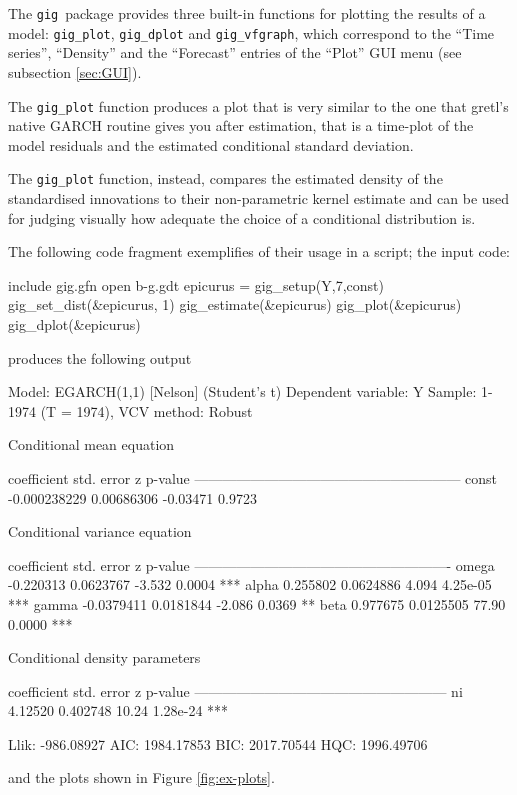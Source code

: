 \documentclass[a4paper,11pt]{article}
\newcommand{\app}[1]{\textsf{#1}}
\newcommand{\cmd}[1]{\texttt{#1}}
\newcounter{script}[section]
\newcommand{\gig}{\texttt{gig}}
\begin{document}
The \gig\ package provides three built-in functions for plotting the
results of a model: \cmd{gig\_plot}, \cmd{gig\_dplot} and
\cmd{gig\_vfgraph}, which correspond to the ``Time series'',
``Density'' and the ``Forecast'' entries of the ``Plot'' GUI menu (see
subsection \ref{sec:GUI}).

The \cmd{gig\_plot} function produces a plot that is very similar to
the one that \app{gretl}'s native GARCH routine gives you after
estimation, that is a time-plot of the model residuals and the
estimated conditional standard deviation. 

The \cmd{gig\_plot} function, instead, compares the estimated density
of the standardised innovations to their non-parametric kernel
estimate and can be used for judging visually how adequate the choice
of a conditional distribution is.

The following code
fragment exemplifies of their usage in a script; the input code:

\begin{code}
include gig.gfn
open b-g.gdt
epicurus = gig_setup(Y,7,const)
gig_set_dist(&epicurus, 1)
gig_estimate(&epicurus)
gig_plot(&epicurus)
gig_dplot(&epicurus)  
\end{code}
produces the following output
\begin{code}
Model: EGARCH(1,1) [Nelson] (Student's t)
Dependent variable: Y
Sample: 1-1974 (T = 1974), VCV method: Robust

    Conditional mean equation

             coefficient    std. error      z       p-value
  ---------------------------------------------------------
  const      -0.000238229   0.00686306   -0.03471   0.9723 

    Conditional variance equation

             coefficient   std. error     z      p-value 
  -------------------------------------------------------
  omega      -0.220313     0.0623767    -3.532   0.0004   ***
  alpha       0.255802     0.0624886     4.094   4.25e-05 ***
  gamma      -0.0379411    0.0181844    -2.086   0.0369   **
  beta        0.977675     0.0125505    77.90    0.0000   ***

    Conditional density parameters

             coefficient   std. error     z     p-value 
  ------------------------------------------------------
  ni           4.12520      0.402748    10.24   1.28e-24 ***

	Llik:   -986.08927	 AIC:   1984.17853
	BIC:    2017.70544	 HQC:   1996.49706
\end{code}
and the plots shown in Figure \ref{fig:ex-plots}.
\end{document}
